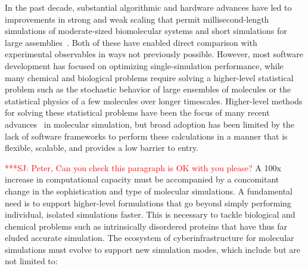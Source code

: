 \documentclass[10pt,letterpaper,draft]{article}
\newcommand{\jhanote}[1]{ \textcolor{red}  {***SJ:#1}\xspace}
\newcommand{\jhanote}[1]{}
\begin{document}
{\noindent In} the past decade, substantial algorithmic and hardware advances have led to
improvements in strong and weak scaling that permit millisecond-length
simulations of moderate-sized biomolecular systems and short simulations for
large assemblies~\cite{kasson2}.  Both of these have enabled direct comparison with
experimental observables in ways not previously possible.  However, most
software development has focused on optimizing single-simulation performance,
while many chemical and biological problems require solving a higher-level
statistical problem such as the stochastic behavior of large ensembles of
molecules or the statistical physics of a few molecules over longer timescales.
Higher-level methods for solving these statistical problems have been the focus
of many recent advances~\cite{kasson1} in molecular simulation, but broad adoption has been
limited by the lack of software frameworks to perform these calculations in a
manner that is flexible, scalable, and provides a low barrier to entry.


\jhanote{ Peter, Can you check this paragraph is OK with you please?}
A 100x increase in computational capacity must be accompanied by a concomitant
change in the sophistication and type of molecular simulations. A fundamental
need is to support higher-level formulations that go beyond simply performing
individual, isolated simulations faster.
This is necessary to tackle biological and chemical problems such as
intrinsically disordered proteins that have thus far eluded accurate simulation.
The ecosystem of cyberinfrastructure for molecular simulations must evolve to
support new simulation modes, which include but are not limited to:
\end{document}
